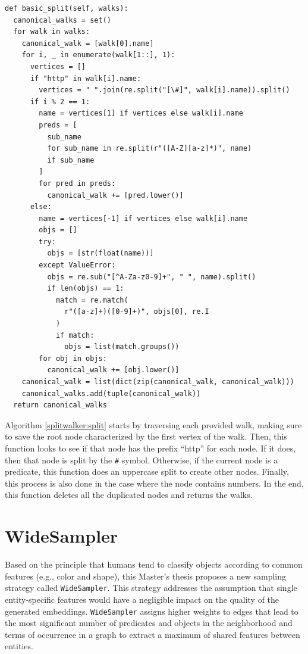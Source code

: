 \begin{lstlisting}[caption=Splits Nodes of Random Walks with \texttt{SplitWalker}.,label=splitwalker:split]
def basic_split(self, walks):
  canonical_walks = set()
  for walk in walks:
    canonical_walk = [walk[0].name]
    for i, _ in enumerate(walk[1::], 1):
      vertices = []
      if "http" in walk[i].name:
        vertices = " ".join(re.split("[\#]", walk[i].name)).split()
      if i % 2 == 1:
        name = vertices[1] if vertices else walk[i].name
        preds = [
          sub_name
          for sub_name in re.split(r"([A-Z][a-z]*)", name)
          if sub_name
        ]
        for pred in preds:
          canonical_walk += [pred.lower()]
      else:
        name = vertices[-1] if vertices else walk[i].name
        objs = []
        try:
          objs = [str(float(name))]
        except ValueError:
          objs = re.sub("[^A-Za-z0-9]+", " ", name).split()
          if len(objs) == 1:
            match = re.match(
              r"([a-z]+)([0-9]+)", objs[0], re.I
            )
            if match:
              objs = list(match.groups())
        for obj in objs:
          canonical_walk += [obj.lower()]
    canonical_walk = list(dict(zip(canonical_walk, canonical_walk)))
    canonical_walks.add(tuple(canonical_walk))
  return canonical_walks
\end{lstlisting}

Algorithm \ref{splitwalker:split} starts by traversing each provided
walk, making sure to save the root node characterized by the first vertex of the
walk. Then, this function looks to see if that node has the prefix ``http'' for
each node. If it does, then that node is split by the \texttt{\#}
symbol. Otherwise, if the current node is a predicate, this function does an
uppercase split to create other nodes. Finally, this process is also done in the
case where the node contains numbers. In the end, this function deletes all the
duplicated nodes and returns the walks.

\section{WideSampler}
\label{sec:wide:sampler}

Based on the principle that humans tend to classify objects according to common
features (e.g., color and shape), this Master's thesis proposes a new sampling
strategy called \texttt{WideSampler}. This strategy addresses the assumption
that single entity-specific features would have a negligible impact on the
quality of the generated embeddings. \texttt{WideSampler} assigns higher weights
to edges that lead to the most significant number of predicates and objects in
the neighborhood and terms of occurrence in a graph to extract a maximum of
shared features between entities.

